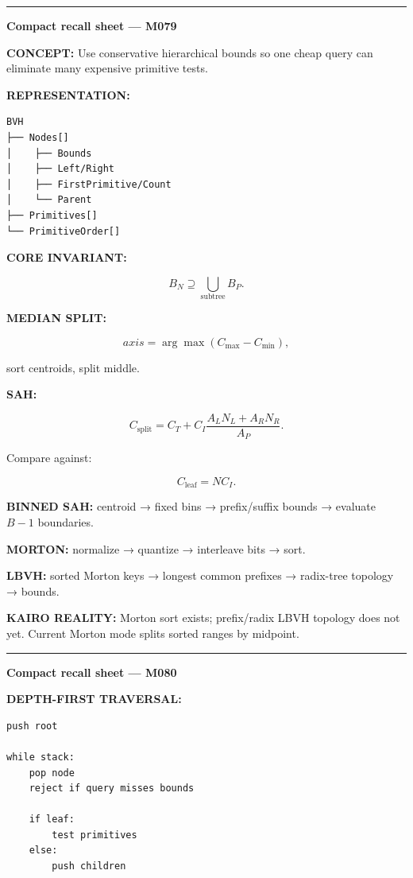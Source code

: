 \begin{center}\rule{0.5\linewidth}{0.5pt}\end{center}

\textbf{Compact recall sheet --- M079}

\textbf{CONCEPT:} Use conservative hierarchical bounds so one cheap query can eliminate many expensive primitive tests.

\textbf{REPRESENTATION:}

\begin{verbatim}
BVH
├── Nodes[]
│    ├── Bounds
│    ├── Left/Right
│    ├── FirstPrimitive/Count
│    └── Parent
├── Primitives[]
└── PrimitiveOrder[]
\end{verbatim}

\textbf{CORE INVARIANT:}

\[
B_N\supseteq
\bigcup_{\text{subtree}}B_P.
\]

\textbf{MEDIAN SPLIT:}

\[
axis=\arg\max
(C_{\max}-C_{\min}),
\]

sort centroids, split middle.

\textbf{SAH:}

\[
C_{\text{split}}
=
C_T+
C_I
\frac{
A_LN_L+A_RN_R
}{
A_P
}.
\]

Compare against:

\[
C_{\text{leaf}}
=
NC_I.
\]

\textbf{BINNED SAH:} centroid → fixed bins → prefix/suffix bounds → evaluate \(B-1\) boundaries.

\textbf{MORTON:} normalize → quantize → interleave bits → sort.

\textbf{LBVH:} sorted Morton keys → longest common prefixes → radix-tree topology → bounds.

\textbf{KAIRO REALITY:} Morton sort exists; prefix/radix LBVH topology does not yet. Current Morton mode splits sorted ranges by midpoint.

\begin{center}\rule{0.5\linewidth}{0.5pt}\end{center}

\textbf{Compact recall sheet --- M080}

\textbf{DEPTH-FIRST TRAVERSAL:}

\begin{verbatim}
push root

while stack:
    pop node
    reject if query misses bounds

    if leaf:
        test primitives
    else:
        push children
\end{verbatim}


